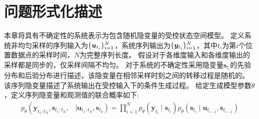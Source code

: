 
\section{问题形式化描述}
\label{sec:5_formal}
本章将具有不确定性的系统表示为包含随机隐变量的受控状态空间模型。
定义系统非均匀采样的序列输入为$\{\boldsymbol{u}_{t_i}\}_{i=1}^{N}$，系统序列输出为$\{\boldsymbol{y}_{t_i}\}_{i=1}^{N}$，其中$t_i$为第$i$个位置数据点的采样时间，$N$为完整序列长度。
假设对于各维度输入和各维度输出的采样都是同步的，仅采样间隔不均匀。
对于系统的不确定性采用隐变量$\boldsymbol{s}_{t_{i}}$的先验分布和后验分布进行描述，该隐变量在相邻采样时刻之间的转移过程是随机的。
该序列隐变量描述了系统输出在受控输入下的条件生成过程。
给定生成模型参数$\theta$，定义序列隐变量和观测值的联合概率如下:
\begin{equation}
    \begin{aligned}
    p_{\theta}\left(\boldsymbol{y}_{t_1: t_N}, \boldsymbol{s}_{t_1:t_N},\right.&\left. \mid \boldsymbol{u}_{t_1: t_N}, \boldsymbol{s}_{t_0}\right)=\prod_{i=1}^{N}
    p_{\theta}\left(\boldsymbol{y}_{t_i} \mid \boldsymbol{s}_{t_i}\right)   {p}_{\theta}\left(\boldsymbol{s}_{t_i} \mid \boldsymbol{u}_{t_{i-1}},\boldsymbol{s}_{t_{i-1}}\right)
    \end{aligned}
    \label{equ:discrete_rssm}
\end{equation}
